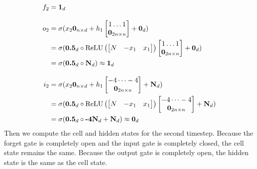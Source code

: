 \begin{align*}
  f_2 &= \textbf{1}_d \\[2ex]
  o_2 &= \sigma(x_2\textbf{0}_{n\times d} + h_{1}\begin{bmatrix} 1 \dots 1 \\ \textbf{0}_{2n\times n} \end{bmatrix}  + \textbf{0}_d) \\
  &= \sigma(\textbf{0.5}_d\circ \operatorname{ReLU}\left( \begin{bmatrix} N & -x_1 & x_1 \end{bmatrix}\right)\begin{bmatrix} 1 \dots 1 \\ \textbf{0}_{2n\times n} \end{bmatrix}  + \textbf{0}_d)  \\
  &=  \sigma(\textbf{0.5}_d\circ \textbf{N}_d) \approx \textbf{1}_d \\[2ex]
  i_2 &= \sigma(x_2\textbf{0}_{n\times d} + h_{1}\begin{bmatrix} -4 \dots -4 \\ \textbf{0}_{2n\times n} \end{bmatrix}  + \textbf{N}_d)  \\
  &= \sigma(\textbf{0.5}_d\circ \operatorname{ReLU}\left( \begin{bmatrix} N & -x_1 & x_1 \end{bmatrix}\right)\begin{bmatrix} -4 \dots -4 \\ \textbf{0}_{2n\times n} \end{bmatrix}  + \textbf{N}_d)   \\
  &=  \sigma(\textbf{0.5}_d\circ\textbf{-4N}_d + \textbf{N}_d) \approx \textbf{0}_d
\end{align*}
%
Then we compute the cell and hidden states for the second timestep. Because the forget gate is completely open and the input gate is completely closed, the cell state remains the same. Because the output gate is completely open, the hidden state is the same as the cell state.
%
